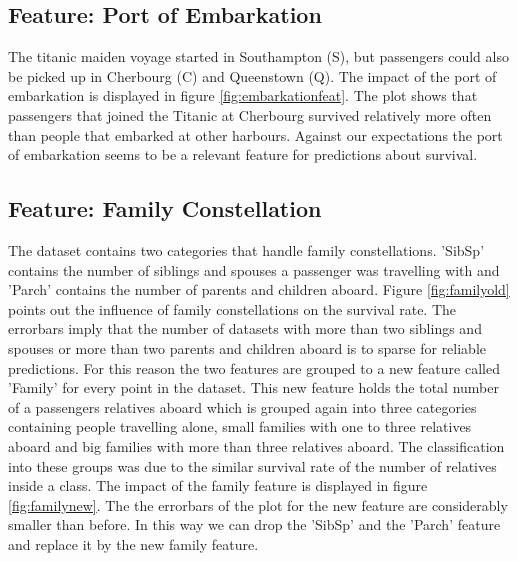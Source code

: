  \subsection{Feature: Port of Embarkation}
 The titanic maiden voyage started in Southampton (S), but passengers could also be picked up in Cherbourg (C) and Queenstown (Q). The impact of the port of embarkation is displayed in figure \ref{fig:embarkationfeat}. The plot shows that passengers that joined the Titanic at Cherbourg survived relatively more often than people that embarked at other harbours. Against our expectations the port of embarkation seems to be a relevant feature for predictions about survival.

 \subsection{Feature: Family Constellation}
 The dataset contains two categories that handle family constellations. 'SibSp' contains the number of siblings and spouses a passenger was travelling with and 'Parch' contains the number of parents and children aboard. Figure \ref{fig:familyold} points out the influence of family constellations on the survival rate. The errorbars imply that the number of datasets with more than two siblings and spouses or more than two parents and children aboard is to sparse for reliable predictions. For this reason the two features are grouped to a new feature called 'Family' for every point in the dataset. This new feature holds the total number of a passengers relatives aboard which is grouped again into three categories containing people travelling alone, small families with one to three relatives aboard and big families with more than three relatives aboard. The classification into these groups was due to the similar survival rate of the number of relatives inside a class. The impact of the family feature is displayed in figure \ref{fig:familynew}. The the errorbars of the plot for the new feature are considerably smaller than before. In this way we can drop the 'SibSp' and the 'Parch' feature and replace it by the new family feature.
 
